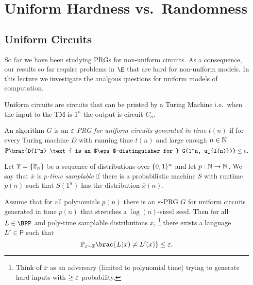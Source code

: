 \newcommand{\fws}{\ensuremath{ f^{\text{ws}} }}

\chapter{Uniform Hardness vs.\ Randomness}
\label{lec:04}


\section{Uniform Circuits}

So far we have been studying PRGs for non-uniform circuits. As a consequence,
our results so far require problems in $\E$ that are hard for non-uniform models.
In this lecture we investigate the analgous questions for uniform models of
computation.


\begin{definition}
	Uniform circuits are circuits that can be printed by a Turing Machine i.e.\ when the input to the TM is $1^n$ the output is circuit $C_n$.
\end{definition}

\begin{definition}
  An algorithm $G$ is an \emph{$\varepsilon$-PRG for uniform circuits generated in
  time $t(n)$} if for every Turing machine $D$ with running time $t(n)$ and
  large enough $n \in \mathbb{N}$
	\[
		\Pr\brac{D(1^n) \text{ is an $\eps$-distinguisher for } G(1^n, u_{l(n)})} \leq \eps.
	\]
\end{definition}

\begin{definition}\label{p-sample-dist}
  Let $\overline{x} = \{\overline{x}_n\}$ be a sequence of distributions over
  $\{0, 1\}^n$ and let $p : \mathbb{N} \to \mathbb{N}$. We say that $\overline{x}$ is
  \emph{$p$-time samplable} if there is a probabilistic machine $S$ with
  runtime $p(n)$ such that $S(1^n)$ has the distribution $\overline{x}(n)$.
\end{definition}

\begin{theorem}\label{thm:DR-on-average}
  Assume that for all polynomials $p(n)$ there is an $\varepsilon$-PRG $G$ for uniform
  circuits generated in time $p(n)$ that stretches a $\log(n)$-sized seed. Then
  for all $L \in \BPP$ and poly-time samplable distributions $\overline{x}$,%
  \footnote{Think of $\overline{x}$ as an adversary (limited to polynomial
  time) trying to generate hard inputs with $\geq \varepsilon$ probability.} there
  exists a language $L' \in \textsf{P}$ such that
	\[
		\Pr_{x \sim \overline{x}}\brac{L(x) \neq L'(x)} \leq \eps.
	\]
\end{theorem}


